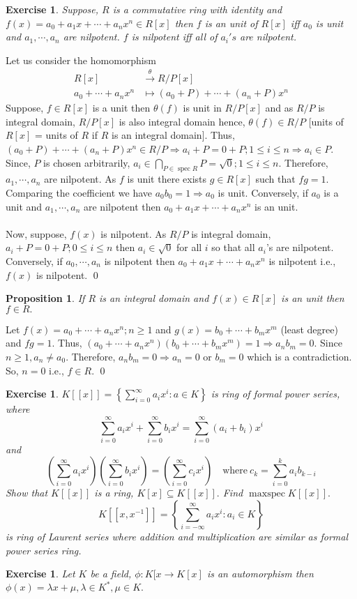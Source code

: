 \documentclass[11pt]{amsart}
\newtheorem{ex}[theorem]{Exercise}
\newtheorem{proposition}[theorem]{Proposition}%
\DeclareMathOperator{\spec}{\text{spec}}
\begin{document}
\begin{ex}
Suppose, $R$ is a commutative ring with identity and $f(x)=a_0+a_1x+\cdots +a_nx^n \in R[x]$ then $f$ is an unit of $R[x]$ iff $a_0$ is unit and $a_1,\cdots ,a_n$ are nilpotent. $f$ is nilpotent iff all of $a_i's$ are nilpotent.
\end{ex}
\proof Let us consider the homomorphism \begin{align*}
R[x]&\stackrel{\theta}{\longrightarrow} R/P[x]\\
a_0+\cdots +a_nx^n&\mapsto (a_0+P)+\cdots +(a_n+P)x^n
\end{align*}
Suppose, $f\in R[x]$ is a unit then $\theta(f)$ is unit in $R/P[x]$ and as $R/P$ is integral domain, $R/P[x]$ is also integral domain hence, $\theta(f)\in R/P$ [units of $R[x]$ = units of $R$ if $R$ is an integral domain]. Thus, $(a_0+P)+\cdots +(a_n+P)x^n\in R/P \Rightarrow a_i+P=0+P;1\leq i\leq n \Rightarrow a_i\in P$. Since, $P$ is chosen arbitrarily, $a_i\in \displaystyle\bigcap_{P\in \spec R} P=\sqrt{0};1\leq i\leq n$. Therefore, $a_1,\cdots ,a_n$ are nilpotent. As $f$ is unit there exists $g\in R[x]$ such that $fg=1$. Comparing the coefficient we have $a_0b_0=1 \Rightarrow a_0$ is unit. Conversely, if $a_0$ is a unit and $a_1,\cdots ,a_n$ are nilpotent then $a_0+a_1x+\cdots +a_nx^n$ is an unit.\\\\
Now, suppose, $f(x)$ is nilpotent. As $R/P$ is integral domain, $a_i+P=0+P;0\leq i\leq n$ then $a_i\in \sqrt{0}$ for all $i$ so that all $a_i$'s are nilpotent. Conversely, if $a_0,\cdots ,a_n$ is nilpotent then $a_0+a_1x+\cdots +a_nx^n$ is nilpotent i.e., $f(x)$ is nilpotent. \qed
\begin{proposition}
If $R$ is an integral domain and $f(x)\in R[x]$ is an unit then $f\in R.$
\end{proposition}
\proof Let $f(x)=a_0+\cdots +a_nx^n;n\geq 1$ and $g(x)=b_0+\cdots +b_mx^m$ (least degree) and $fg=1.$ Thus, $(a_0+\cdots +a_nx^n)(b_0+\cdots +b_mx^m)=1 \Rightarrow a_nb_m=0$. Since $n\geq 1, a_n\neq a_0.$ Therefore, $a_nb_m=0 \Rightarrow a_n=0$ or $b_m=0$ which is a contradiction. So, $n=0$ i.e., $f\in R.$ \qed
\begin{ex}
$K[[x]]=\left\lbrace\displaystyle\sum_{i=0}^{\infty} a_ix^i:a\in K\right\rbrace$ is ring of formal power series, where $$\displaystyle\sum_{i=0}^{\infty} a_ix^i+\displaystyle\sum_{i=0}^{\infty} b_ix^i=\displaystyle\sum_{i=0}^{\infty} (a_i+b_i)x^i$$ and $$\left(\displaystyle\sum_{i=0}^{\infty} a_ix^i\right)\left(\displaystyle\sum_{i=0}^{\infty} b_ix^i\right)=\left(\displaystyle\sum_{i=0}^{\infty} c_ix^i\right) \quad\text{where}~c_k=\displaystyle\sum_{i=0}^{k} a_ib_{k-i}$$ Show that $K[[x]]$ is a ring, $K[x]\subseteq K[[x]].$ Find $\operatorname{maxspec}K[[x]].$ \\
$$K[[x,x^{-1}]]=\left\lbrace\displaystyle\sum_{i=-\infty}^{\infty} a_ix^i:a_i\in K\right\rbrace$$ is ring of Laurent series where addition and multiplication are similar as formal power series ring.
\end{ex}
\begin{ex}
Let $K$ be a field, $\phi:K[x\to K[x]$ is an automorphism then $\phi(x)=\lambda x+\mu, \lambda\in K^*,\mu \in K.$
\end{ex}
\end{document}
